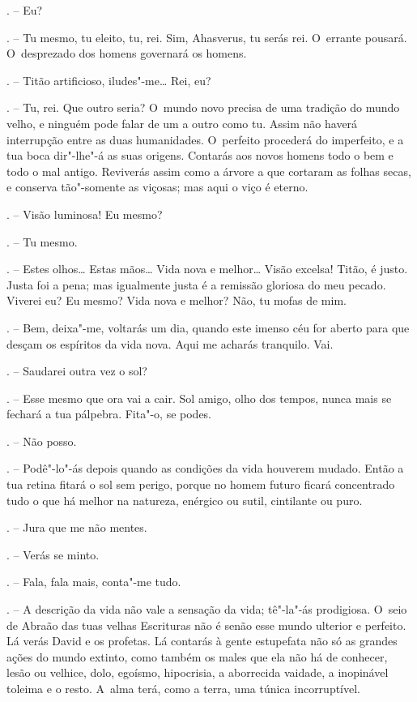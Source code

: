 \begin{Parskip}
. -- Eu?

. -- Tu mesmo, tu eleito, tu, rei. Sim, Ahasverus, tu serás rei.
O~errante pousará. O~desprezado dos homens governará os homens.

. -- Titão artificioso, iludes"-me\ldots{} Rei, eu?

. -- Tu, rei. Que outro seria? O~mundo novo precisa de uma
tradição do mundo velho, e ninguém pode falar de um a outro como tu.
Assim não haverá interrupção entre as duas humanidades. O~perfeito
procederá do imperfeito, e a tua boca dir"-lhe"-á as suas origens.
Contarás aos novos homens todo o bem e todo o mal antigo. Reviverás
assim como a árvore a que cortaram as folhas secas, e conserva
tão"-somente as viçosas; mas aqui o viço é eterno.

. -- Visão luminosa! Eu mesmo?

. -- Tu mesmo.

. -- Estes olhos\ldots{} Estas mãos\ldots{} Vida nova e melhor\ldots{} Visão
excelsa! Titão, é justo. Justa foi a pena; mas igualmente justa é a
remissão gloriosa do meu pecado. Viverei eu? Eu mesmo? Vida nova e
melhor? Não, tu mofas de mim.

. -- Bem, deixa"-me, voltarás um dia, quando este imenso céu for
aberto para que desçam os espíritos da vida nova. Aqui me acharás
tranquilo. Vai.

. -- Saudarei outra vez o sol?

. -- Esse mesmo que ora vai a cair. Sol amigo, olho dos tempos,
nunca mais se fechará a tua pálpebra. Fita"-o, se podes.

. -- Não posso.

. -- Podê"-lo"-ás depois quando as condições da vida houverem
mudado. Então a tua retina fitará o sol sem perigo, porque no homem
futuro ficará concentrado tudo o que há melhor na natureza, enérgico ou
sutil, cintilante ou puro.

. -- Jura que me não mentes.

. -- Verás se minto.

. -- Fala, fala mais, conta"-me tudo.

. -- A descrição da vida não vale a sensação da vida; tê"-la"-ás
prodigiosa. O~seio de Abraão das tuas velhas Escrituras não é senão esse
mundo ulterior e perfeito. Lá verás David e os profetas. Lá contarás à
gente estupefata não só as grandes ações do mundo extinto, como também
os males que ela não há de conhecer, lesão ou velhice, dolo, egoísmo,
hipocrisia, a aborrecida vaidade, a inopinável toleima e o resto. A~alma
terá, como a terra, uma túnica incorruptível.


\end{Parskip}
